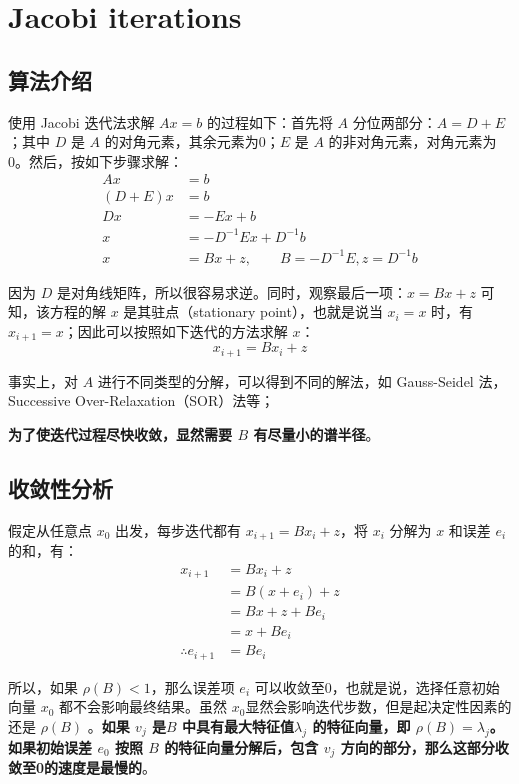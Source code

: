 \documentclass[12pt]{article}
\begin{document}
\section{Jacobi iterations}
\subsection{算法介绍}
使用 Jacobi 迭代法求解 $Ax = b$ 的过程如下：首先将 $A$ 分位两部分：$A = D + E$；其中 $D$ 是 $A$ 的对角元素，其余元素为0；$E$ 是 $A$ 的非对角元素，对角元素为0。然后，按如下步骤求解：
\begin{align*}
Ax &= b \\
(D+E) x &= b \\
Dx &= -Ex + b \\
x &= -D^{-1}Ex + D^{-1}b \\
x &= Bx + z, \qquad B = -D^{-1}E, z = D^{-1}b
\end{align*}

因为 $D$ 是对角线矩阵，所以很容易求逆。同时，观察最后一项：$x = Bx + z$ 可知，该方程的解 $x$ 是其驻点（stationary point），也就是说当 $x_i = x$ 时，有 $x_{i+1} = x$；因此可以按照如下迭代的方法求解 $x$：
$$
x_{i+1} = Bx_i + z
$$

事实上，对 $A$ 进行不同类型的分解，可以得到不同的解法，如 Gauss-Seidel 法，Successive Over-Relaxation（SOR）法等；

\textbf{为了使迭代过程尽快收敛，显然需要 $B$ 有尽量小的谱半径}。

\subsection{收敛性分析}
假定从任意点 $x_0$ 出发，每步迭代都有 $x_{i+1} = Bx_i + z$，将 $x_i$ 分解为 $x$ 和误差 $e_i$ 的和，有：
\begin{align*}
x_{i+1} &= Bx_i + z \\
 	   &= B(x + e_i) + z \\
	   &= Bx + z + Be_i \\
	   &= x + Be_i \\
\therefore e_{i+1} &= Be_i
\end{align*}

所以，如果 $\rho(B) < 1$，那么误差项 $e_i$ 可以收敛至0，也就是说，选择任意初始向量 $x_0$ 都不会影响最终结果。虽然 $x_0$显然会影响迭代步数，但是起决定性因素的还是 $\rho(B)$ 。\textbf{如果 $v_j$ 是$B$ 中具有最大特征值$\lambda_j$ 的特征向量，即 $\rho(B) = \lambda_j$。如果初始误差 $e_0$ 按照 $B$ 的特征向量分解后，包含 $v_j$ 方向的部分，那么这部分收敛至0的速度是最慢的}。
\end{document}
